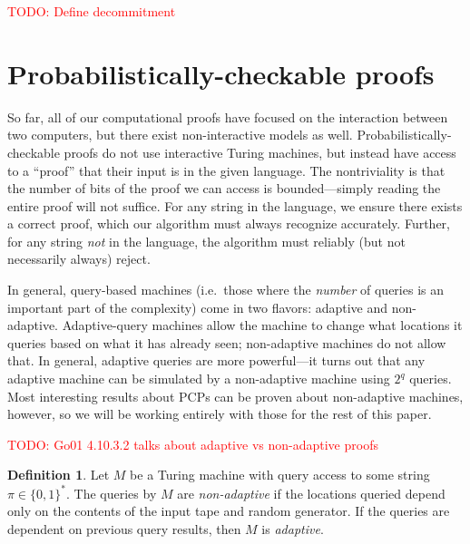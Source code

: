 \documentclass[english,12pt]{reedthesis}
\theoremstyle{plain}
\theoremstyle{definition}
\newtheorem{defn}[defn]{Definition}
\theoremstyle{remark}
\newcommand{\TODO}[1]{\textcolor{red}{TODO: #1}}
\begin{document}
\TODO{Define decommitment}

\section{Probabilistically-checkable proofs}\label{sec:pcp}

So far, all of our computational proofs have focused on the interaction between
two computers, but there exist non-interactive models as well.
Probabilistically-checkable proofs do not use interactive Turing machines, but
instead have access to a ``proof'' that their input is in the given language.
The nontriviality is that the number of bits of the proof we can access is
bounded---simply reading the entire proof will not suffice. For any string in the
language, we ensure there exists a correct proof, which our algorithm must
always recognize accurately. Further, for any string \emph{not} in the language,
the algorithm must reliably (but not necessarily always) reject.

In general, query-based machines (i.e.\ those where the \emph{number} of queries
is an important part of the complexity) come in two flavors: adaptive and
non-adaptive. Adaptive-query machines allow the machine to change what locations
it queries based on what it has already seen; non-adaptive machines do not allow
that. In general, adaptive queries are more powerful---it turns out that any
adaptive machine can be simulated by a non-adaptive machine using $2^{q}$
queries. Most interesting results about PCPs can be proven about non-adaptive
machines, however, so we will be working entirely with those for the rest of
this paper.

\TODO{Go01 4.10.3.2 talks about adaptive vs non-adaptive proofs}

\begin{defn}\label{def:adaptive}
  Let $M$ be a Turing machine with query access to some string
  $\pi \in \{0, 1\}^{*}$. The queries by $M$ are \emph{non-adaptive} if the
  locations queried depend only on the contents of the input tape and random
  generator. If the queries are dependent on previous query results, then $M$ is
  \emph{adaptive}.
\end{defn}
\end{document}
